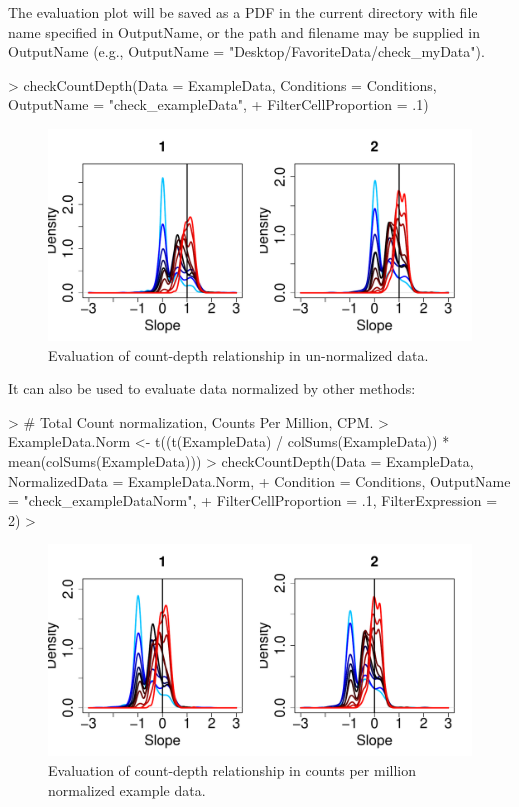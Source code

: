 \documentclass{article}
\begin{document}
The evaluation plot will be saved as a PDF in the current directory with file name specified in OutputName, or the path and filename may be supplied in OutputName (e.g., OutputName = "Desktop/FavoriteData/check\_myData").

\begin{Schunk}
\begin{Sinput}
> checkCountDepth(Data = ExampleData, Conditions = Conditions, OutputName = "check_exampleData", 
+                 FilterCellProportion = .1)
\end{Sinput}
\end{Schunk}
  
\begin{figure}[h!]
\centering
\includegraphics[width=.7\textwidth]{check_exampleData_initial_evaluation.pdf}
\caption{Evaluation of count-depth relationship in un-normalized data.}
\end{figure}

\newpage
It can also be used to evaluate data normalized by other methods:
\begin{Schunk}
\begin{Sinput}
> # Total Count normalization, Counts Per Million, CPM. 
> ExampleData.Norm <- t((t(ExampleData) / colSums(ExampleData)) * mean(colSums(ExampleData))) 
> checkCountDepth(Data = ExampleData, NormalizedData = ExampleData.Norm, 
+                 Condition = Conditions, OutputName = "check_exampleDataNorm",  
+                 FilterCellProportion = .1, FilterExpression = 2)
> 
\end{Sinput}
\end{Schunk}

\begin{figure}[h!]
\centering
\includegraphics[width=.7\textwidth]{check_exampleDataNorm_count-depth_evaluation}
\caption{Evaluation of count-depth relationship in counts per million normalized example data.}
\end{figure}
\end{document}
